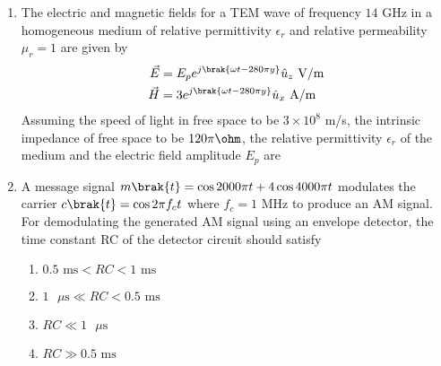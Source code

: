 \documentclass[a4paper, 11pt]{article}
\begin{document}
\begin{enumerate}
    \hfill{}
    
    \item The electric and magnetic fields for a TEM wave of frequency $14$ GHz in a homogeneous medium of relative permittivity $\epsilon_{r}$ and relative permeability $\mu_{r}=1$ are given by
    \begin{align*}
        \vec{E} &= E_{p}e^{j\brak{\omega t-280\pi y}}\hat{u}_{z} \text{ V/m} \\
        \vec{H} &= 3e^{j\brak{\omega t-280\pi y}}\hat{u}_{x} \text{ A/m}
    \end{align*}
    Assuming the speed of light in free space to be $3\times10^{8}$ m/s, the intrinsic impedance of free space to be $120\pi \ohm$, the relative permittivity $\epsilon_{r}$ of the medium and the electric field amplitude $E_{p}$ are
    
    \begin{enumerate}
    \end{enumerate}

    \hfill{}

    \item A message signal $m\brak{t}=\cos{2000\pi t}+4\cos{4000\pi t}$ modulates the carrier $c\brak{t}=\cos{2\pi f_{c}t}$ where $f_{c}=1$ MHz to produce an AM signal. For demodulating the generated AM signal using an envelope detector, the time constant RC of the detector circuit should satisfy
    
    \begin{enumerate}
        \item $0.5 \text{ ms} < RC < 1 \text{ ms}$
        \item $1 \text{ }\mu\text{s} \ll RC < 0.5 \text{ ms}$
        \item $RC \ll 1 \text{ }\mu\text{s}$
        \item $RC \gg 0.5 \text{ ms}$
    \end{enumerate}

    \hfill{}


\end{enumerate}
\end{document}
